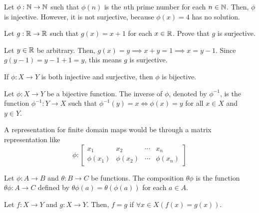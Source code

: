     \begin{example}
        Let \(\phi : \mathbb{N}\to\mathbb{N}\) such that \(\phi(n)\) is the \(n\)th prime number for each \(n\in\mathbb{N}\). Then, \(\phi\) is injective. However, it is not surjective, because \(\phi(x) = 4\) has no solution.
    \end{example}

    \begin{example}
        Let \(g : \mathbb{R}\to\mathbb{R}\) such that \(g(x) = x + 1\) for each \(x\in\mathbb{R}\). Prove that \(g\) is surjective.

        Let \(y\in\mathbb{R}\) be arbitrary. Then, \(g(x) = y \implies x + y = 1 \implies x = y - 1\). Since \(g(y - 1) = y - 1 + 1 = y\), this means \(g\) is surjective.
    \end{example}

    \begin{dfn}
        If \(\phi : X \to Y\) is both injective and surjective, then \(\phi\) is bijective.
    \end{dfn}

    \begin{dfn}[Inverse]
        Let \(\phi : X \to Y\) be a bijective function. The inverse of \(\phi\), denoted by \(\phi^{-1}\), is the function \(\phi^{-1} : Y \to X\) such that \(\phi^{-1}(y) = x \iff \phi(x) = y\) for all \(x\in X\) and \(y\in Y\).
    \end{dfn}

    A representation for finite domain maps would be through a matrix representation like \[\phi : \begin{bmatrix}
        x_1 & x_2 & \cdots & x_n \\
        \phi(x_1) & \phi(x_2) & \cdots & \phi(x_n)
    \end{bmatrix}\]

    \begin{dfn}
        Let \(\phi : A \to B\) and \(\theta : B \to C\) be functions. The composition \(\theta\phi\) is the function \(\theta\phi : A \to C\) defined by \(\theta\phi(a) = \theta\left(\phi(a)\right)\) for each \(a\in A\).
    \end{dfn}

    \begin{dfn}
        Let \(f : X \to Y\) and \(g : X \to Y\). Then, \(f = g\) if \(\forall x \in X \left(f(x) = g(x)\right)\).
    \end{dfn}

